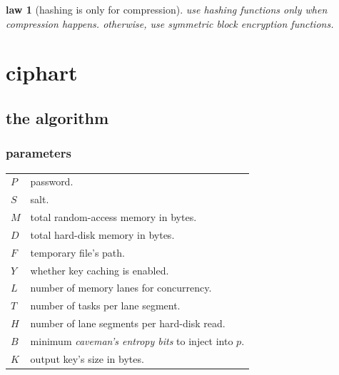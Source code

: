 \documentclass[twocolumn]{article}
\newtheorem{law}{law}
\begin{document}
\begin{law}[hashing is only for compression]\label{law_simplification}
    use hashing functions only when compression happens.  otherwise, use
    symmetric block encryption functions.
\end{law}

\section{ciphart}
\subsection{the algorithm}
\subsubsection{parameters}
\begin{tabularx}{\columnwidth}{lX}
    $P$ & password.\\
    $S$ & salt.\\
    $M$ & total random-access memory in bytes.\\
    $D$ & total hard-disk memory in bytes.\\
    $F$ & temporary file's path.\\
    $Y$ & whether key caching is enabled.\\
    $L$ & number of memory lanes for concurrency.\\
    $T$ & number of tasks per lane segment.\\
    $H$ & number of lane segments per hard-disk read.\\
    $B$ & minimum \emph{caveman's entropy bits} to inject into $p$.\\
    $K$ & output key's size in bytes.\\
\end{tabularx}
\end{document}
